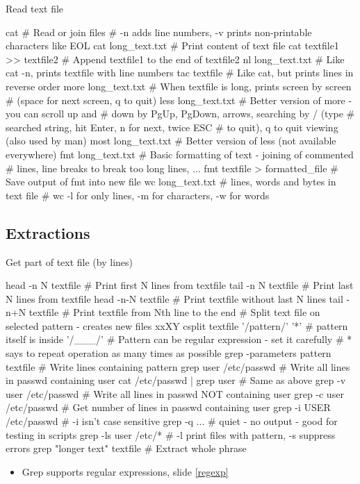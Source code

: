 \documentclass[compress, ucs, xelatex, 11pt, xcolor=svgnames,
  hyperref={
    bookmarks=true,
    unicode=true,
    colorlinks=true,
    pdftitle={Linux, command line and MetaCentrum},
    plainpages=false,
    pdfauthor={Vojtech Zeisek},
    pdfsubject={Course about use of Linux command line, writing shell scripts and using MetaCentrum of CESNET},
    pdfcreator={XeLaTeX},
    pdfkeywords={Linux, GNU, BASH, shell, command line, MetaCentrum},
    linkcolor=DarkRed,
    anchorcolor=DarkBlue,
    citecolor=Indigo,
    filecolor=NavyBlue,
    menucolor=DarkMagenta,
    urlcolor=DarkBlue,
    pdftex},
  url={hyphens, lowtilde} %
  ]{beamer}
\begin{document}
\begin{frame}[fragile]{Read text file}
  \begin{bashcode}
    cat # Read or join files
        # -n adds line numbers, -v prints non-printable characters like EOL
    cat long_text.txt # Print content of text file
    cat textfile1 >> textfile2 # Append textfile1 to the end of textfile2
    nl long_text.txt # Like cat -n, prints textfile with line numbers
    tac textfile # Like cat, but prints lines in reverse order
    more long_text.txt # When textfile is long, prints screen by screen
                       # (space for next screen, q to quit)
    less long_text.txt # Better version of more - you can scroll up and
                       # down by PgUp, PgDown, arrows, searching by / (type
                       # searched string, hit Enter, n for next, twice ESC
                       # to quit), q to quit viewing (also used by man)
    most long_text.txt # Better version of less (not available everywhere)
    fmt long_text.txt # Basic formatting of text - joining of commented
                      # lines, line breaks to break too long lines, ...
    fmt textfile > formatted_file # Save output of fmt into new file
    wc long_text.txt # lines, words and bytes in text file
                     # wc -l for only lines, -m for characters, -w for words
  \end{bashcode}
\end{frame}

\subsection{Extractions}

\begin{frame}[fragile]{Get part of text file (by lines)}
  \begin{bashcode}
    head -n N textfile # Print first N lines from textfile
    tail -n N textfile # Print last N lines from textfile
    head -n-N textfile # Print textfile without last N lines
    tail -n+N textfile # Print textfile from Nth line to the end
    # Split text file on selected pattern - creates new files xxXY
    csplit textfile '/pattern/' '{*}' # pattern itself is inside '/___/'
    # Pattern can be regular expression - set it carefully
    # {*} says to repeat operation as many times as possible
    grep -parameters pattern textfile # Write lines containing pattern
    grep user /etc/passwd # Write all lines in passwd containing user
    cat /etc/passwd | grep user # Same as above
    grep -v user /etc/passwd # Write all lines in passwd NOT containing user
    grep -c user /etc/passwd # Get number of lines in passwd containing user
    grep -i USER /etc/passwd # -i isn't case sensitive
    grep -q ... # quiet - no output - good for testing in scripts
    grep -ls user /etc/* # -l print files with pattern, -s suppress errors
    grep "longer text" textfile # Extract whole phrase
  \end{bashcode}
  \begin{itemize}
    \item Grep supports regular expressions, slide \ref{regexp}
  \end{itemize}
\end{frame}
\end{document}
